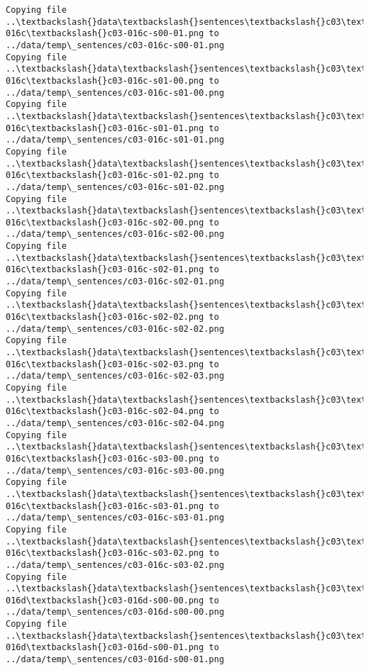 \documentclass[11pt]{article}
\begin{document}
\begin{Verbatim}[commandchars=\\\{\}]
Copying file ..\textbackslash{}data\textbackslash{}sentences\textbackslash{}c03\textbackslash{}c03-016c\textbackslash{}c03-016c-s00-01.png to
../data/temp\_sentences/c03-016c-s00-01.png
Copying file ..\textbackslash{}data\textbackslash{}sentences\textbackslash{}c03\textbackslash{}c03-016c\textbackslash{}c03-016c-s01-00.png to
../data/temp\_sentences/c03-016c-s01-00.png
Copying file ..\textbackslash{}data\textbackslash{}sentences\textbackslash{}c03\textbackslash{}c03-016c\textbackslash{}c03-016c-s01-01.png to
../data/temp\_sentences/c03-016c-s01-01.png
Copying file ..\textbackslash{}data\textbackslash{}sentences\textbackslash{}c03\textbackslash{}c03-016c\textbackslash{}c03-016c-s01-02.png to
../data/temp\_sentences/c03-016c-s01-02.png
Copying file ..\textbackslash{}data\textbackslash{}sentences\textbackslash{}c03\textbackslash{}c03-016c\textbackslash{}c03-016c-s02-00.png to
../data/temp\_sentences/c03-016c-s02-00.png
Copying file ..\textbackslash{}data\textbackslash{}sentences\textbackslash{}c03\textbackslash{}c03-016c\textbackslash{}c03-016c-s02-01.png to
../data/temp\_sentences/c03-016c-s02-01.png
Copying file ..\textbackslash{}data\textbackslash{}sentences\textbackslash{}c03\textbackslash{}c03-016c\textbackslash{}c03-016c-s02-02.png to
../data/temp\_sentences/c03-016c-s02-02.png
Copying file ..\textbackslash{}data\textbackslash{}sentences\textbackslash{}c03\textbackslash{}c03-016c\textbackslash{}c03-016c-s02-03.png to
../data/temp\_sentences/c03-016c-s02-03.png
Copying file ..\textbackslash{}data\textbackslash{}sentences\textbackslash{}c03\textbackslash{}c03-016c\textbackslash{}c03-016c-s02-04.png to
../data/temp\_sentences/c03-016c-s02-04.png
Copying file ..\textbackslash{}data\textbackslash{}sentences\textbackslash{}c03\textbackslash{}c03-016c\textbackslash{}c03-016c-s03-00.png to
../data/temp\_sentences/c03-016c-s03-00.png
Copying file ..\textbackslash{}data\textbackslash{}sentences\textbackslash{}c03\textbackslash{}c03-016c\textbackslash{}c03-016c-s03-01.png to
../data/temp\_sentences/c03-016c-s03-01.png
Copying file ..\textbackslash{}data\textbackslash{}sentences\textbackslash{}c03\textbackslash{}c03-016c\textbackslash{}c03-016c-s03-02.png to
../data/temp\_sentences/c03-016c-s03-02.png
Copying file ..\textbackslash{}data\textbackslash{}sentences\textbackslash{}c03\textbackslash{}c03-016d\textbackslash{}c03-016d-s00-00.png to
../data/temp\_sentences/c03-016d-s00-00.png
Copying file ..\textbackslash{}data\textbackslash{}sentences\textbackslash{}c03\textbackslash{}c03-016d\textbackslash{}c03-016d-s00-01.png to
../data/temp\_sentences/c03-016d-s00-01.png

\end{Verbatim}
\end{document}
